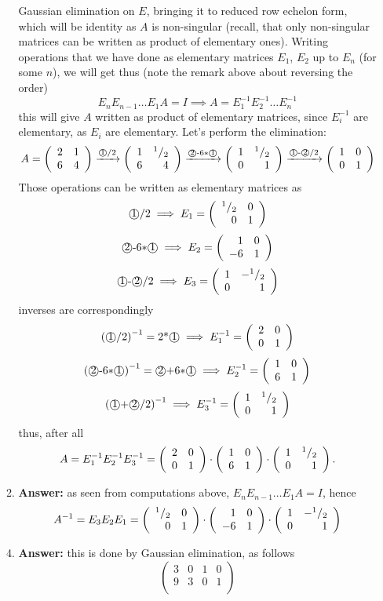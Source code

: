 \documentclass[8pt]{article} %
\begin{document}
\begin{enumerate}[1]
\begin{enumerate}[\bf(a)]
				Gaussian elimination on $E$, bringing it to reduced row echelon form, which will be identity as $A$
				is non-singular (recall, that only non-singular matrices can be written
				as product of elementary ones). Writing operations that we
				have done as elementary matrices $E_1$, $E_2$ up to $E_n$ (for some $n$), we will get thus
				(note the remark above about reversing the order)
				\[E_nE_{n-1}\hdots E_1A=I\implies A=E_1^{-1}E_2^{-1}\hdots E_n^{-1}\]
				this will give $A$ written as product of elementary matrices, since $E_i^{-1}$ are elementary,
				as $E_i$ are elementary. Let's perform the elimination:
				\[A=\left(\begin{array}{rr}2&1\\6&4\end{array}\right)\xrightarrow{\text{\textcircled{1}$/2$}}
				\left(\begin{array}{rr}1&{^{1}/_{2}}\\6&4\end{array}\right)
				\xrightarrow{\text{\textcircled{2}-$6*$\textcircled{1}}}\left(\begin{array}{rr}1&{^{1}/_{2}}\\0&1\end{array}\right)
				\xrightarrow{\text{\textcircled{1}-\textcircled{2}$/2$}}\left(\begin{array}{rr}1&0\\0&1\end{array}\right)
				\]
				Those operations can be written as elementary matrices as
				\[{\text{\textcircled{1}$/2$}}\implies E_1=\left(\begin{array}{rr}{^{1}/_{2}}&0\\0&1\end{array}\right)\]
				\[{\text{\textcircled{2}-$6*$\textcircled{1}}}\implies E_2=\left(\begin{array}{rr}1&0\\-6&1\end{array}\right)\]
				\[{\text{\textcircled{1}-\textcircled{2}$/2$}}\implies E_3=\left(\begin{array}{rr}1&-{^{1}/_{2}}\\0&1\end{array}\right)\]
				inverses are correspondingly
				\[\left(\text{\textcircled{1}$/2$}\right)^{-1}={\text{2*\textcircled{1}}}
				\implies E_1^{-1}=\left(\begin{array}{rr}2&0\\0&1\end{array}\right)\]
				\[\left(\text{\textcircled{2}-$6*$\textcircled{1}}\right)^{-1}={\text{\textcircled{2}+$6*$\textcircled{1}}}
				\implies E_2^{-1}=\left(\begin{array}{rr}1&0\\6&1\end{array}\right)\]
				\[{\left(\text{\textcircled{1}+\textcircled{2}$/2$}\right)}^{-1}\implies 
					E_3^{-1}=\left(\begin{array}{rr}1&{^{1}/_{2}}\\0&1\end{array}\right)\]
				thus, after all
				\[A=E_1^{-1}E_2^{-1}E_3^{-1}=\left(\begin{array}{rr}2&0\\0&1\end{array}\right)\cdot\left(\begin{array}{rr}1&0\\6&1\end{array}\right)\cdot
				\left(\begin{array}{rr}1&{^{1}/_{2}}\\0&1\end{array}\right).\]
			\item {\bf Answer: }as seen from computations above, $E_nE_{n-1}\hdots E_1A=I$, hence
				\[A^{-1}=E_3E_2E_1=\left(\begin{array}{rr}{^{1}/_{2}}&0\\0&1\end{array}\right)\cdot\left(\begin{array}{rr}1&0\\-6&1\end{array}\right)\cdot
				\left(\begin{array}{rr}1&-{^{1}/_{2}}\\0&1\end{array}\right)\]
		\end{enumerate}
	\setcounter{enumi}{9}
		\begin{enumerate}[\bf(a)]
			\setcounter{enumi}{3}
			\item{\bf Answer: }this is done by Gaussian elimination, as follows
				\[\left(\begin{array}{rr|rr}
					3&0&1&0\\
					9&3&0&1\\
				\end{array}\right)
\]
\end{enumerate}
\end{enumerate}
\end{document}
